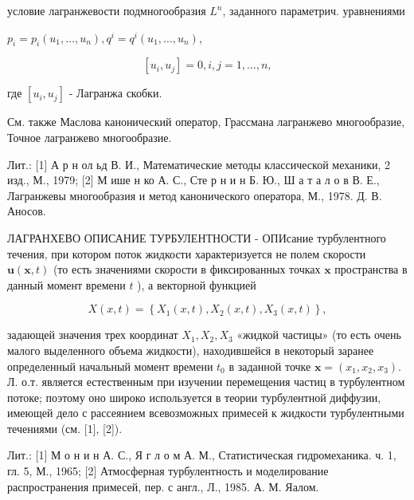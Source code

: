 \documentclass[10pt]{article}
\begin{document}
условие лагранжевости подмногообразия $L^{n}$, заданного параметрич. уравнениями



$p_{i}=p_{i}\left(u_{1}, \ldots, u_{n}\right), q^{i}=q^{i}\left(u_{1}, \ldots, u_{n}\right)$,



\[

\left[u_{i}, u_{j}\right]=0, i, j=1, \ldots, n,

\]



где $\left[u_{i}, u_{j}\right]$ - Лагранжа скобки.



См. также Маслова канонический оператор, Грассмана лагранжево многообразие, Точное лагранжево многообразие.



Лит.: [1] А р н ол ьд В. И., Математические методы классической механики, 2 изд., М., 1979; [2] М ише н ко А. С., Сте р н и н Б. Ю., Ш а т а л о в В. Е., Лагранжевы многообразия и метод канонического оператора, М., 1978. Д. В. Аносов.



ЛАГРАНХЕВО ОПИСАНИЕ ТУРБУЛЕНТНОСТИ - ОПИсание турбулентного течения, при котором поток жидкости характеризуется не полем скорости $\boldsymbol{u}(\boldsymbol{x}, t)$ (то есть значениями скорости в фиксированных точках $\boldsymbol{x}$ пространства в данный момент времени $t$ ), а векторной функцией



\[

X(x, t)=\left\{X_{1}(x, t), X_{2}(x, t), X_{3}(x, t)\right\},

\]



задающей значения трех координат $X_{1}, X_{2}, X_{3}$ «жидкой частицы» (то есть очень малого выделенного объема жидкости), находившейся в некоторый заранее определенный начальный момент времени $t_{0}$ в заданной точке $\boldsymbol{x}=\left(x_{1}, x_{2}, x_{3}\right)$. Л. о.т. является естественным при изучении перемещения частиц в турбулентном потоке; поэтому оно широко используется в теории турбулентной диффузии, имеющей дело с рассеянием всевозможных примесей к жидкости турбулентными течениями (см. [1], [2]).



Лит.: [1] М о н и н А. С., Я г л о м А. М., Статистическая гидромеханика. ч. 1, гл. 5, М., 1965; [2] Атмосферная турбулентность и моделирование распространения примесей, пер. с англ., Л., 1985. А. М. Яалом.
\end{document}
